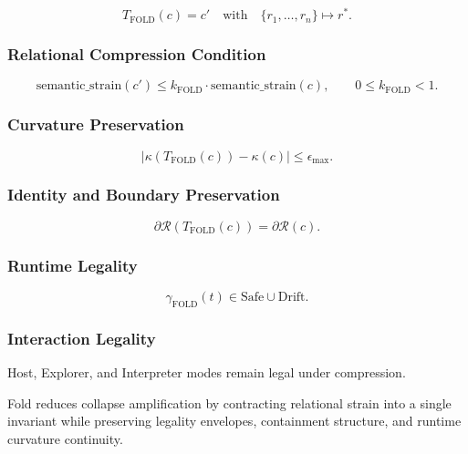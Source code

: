 \[
T_{\mathrm{FOLD}}(c) = c' \quad \text{with} \quad
\{r_1, \dots, r_n\} \mapsto r^*.
\]



\subsubsection*{Relational Compression Condition}



\[
\text{semantic\_strain}(c') \le
k_{\mathrm{FOLD}} \cdot \text{semantic\_strain}(c),
\qquad 0 \le k_{\mathrm{FOLD}} < 1.
\]



\subsubsection*{Curvature Preservation}



\[
|\kappa(T_{\mathrm{FOLD}}(c)) - \kappa(c)| \le \epsilon_{\max}.
\]



\subsubsection*{Identity and Boundary Preservation}



\[
\partial \mathcal{R}(T_{\mathrm{FOLD}}(c)) = \partial \mathcal{R}(c).
\]



\subsubsection*{Runtime Legality}



\[
\gamma_{\mathrm{FOLD}}(t) \in \text{Safe} \cup \text{Drift}.
\]



\subsubsection*{Interaction Legality}

Host, Explorer, and Interpreter modes remain legal under compression.

\medskip

\noindent Fold reduces collapse amplification by contracting relational strain
into a single invariant while preserving legality envelopes, containment
structure, and runtime curvature continuity.

